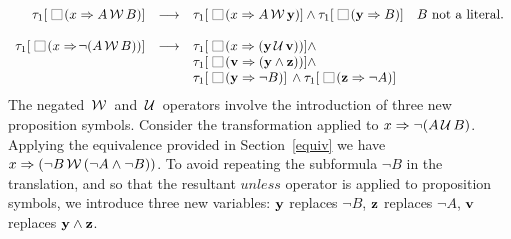 \documentclass[nohyperref]{acmtrans2f}
\newcommand{\always}{\raisebox{-.2ex}{
                           \mbox{\unitlength=0.9ex
                           \begin{picture}(2,2)
                           \linethickness{0.06ex}
                           \put(0,0){\line(1,0){2}}
                           \put(0,2){\line(1,0){2}}
                           \put(0,0){\line(0,1){2}}
                           \put(2,0){\line(0,1){2}}
                           \end{picture}}}
                          \,}
\def\until{\hbox{$\,\cal U \,$}}
\def\unless{\hbox{$\,\cal W \,$}}
\let\imp=\Rightarrow
\begin{document}
$$\begin{array}{rcll}
\\
\tau_1[\always(x \imp  A \unless B)]
 & \longrightarrow  &
\tau_1[\always(x  \imp  A \unless {\bf y})] \land
\tau_1[\always({\bf y}  \imp  B)]
 &\mbox{$B$ not a literal.}\\
\\
\tau_1[\always(x \imp\!\neg (A \unless B))]
 & \longrightarrow  &
\tau_1[\always(x  \imp  ({\bf y} \until {\bf v}))] \land \\
& & \tau_1[\always({\bf v} \imp ({\bf y} \land {\bf z}))] \land \\
&  & \tau_1[\always({\bf y} \imp \neg B)] \,\land 
\tau_1[\always({\bf z} \imp \neg A)]\\
\end{array}
$$
%
The negated $\unless$ and $\until$ operators involve the introduction of
three new proposition symbols. Consider the transformation applied to $x \imp
\neg(A \until B)$. Applying the equivalence provided in Section~\ref{equiv} we
have $x \imp (\neg B \unless (\neg A \land \neg B))$. To avoid repeating
the subformula $\neg B$ in the translation, and so that the resultant
$unless$ operator is applied to proposition symbols, we introduce three new
variables: ${\bf y}$ replaces $\neg B$, ${\bf z}$ replaces $\neg A$, ${\bf v}$ replaces
${\bf y} \land {\bf z}$.
\end{document}
